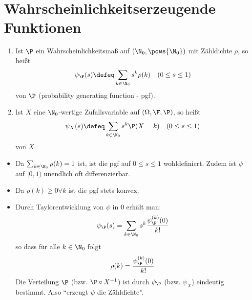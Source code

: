 \section{Wahrscheinlichkeitserzeugende Funktionen}

\begin{definition}
	\label{5_14_definition}
	\begin{enumerate}[leftmargin=*, label=(\arabic*)]
		\item Ist $\P$ ein Wahrscheinlichkeitsmaß auf $(\N_0, \pows{\N_0})$ mit Zähldichte $\rho$, so heißt
		\begin{equation*}
			\psi_{\P}(s) \defeq \sum_{k\in \N_0} s^k \rho(k) \quad (0 \le s \le 1)
		\end{equation*}
		 von $\P$ (probability generating function - pgf).
		\item Ist $X$ eine $\N_0$-wertige Zufallsvariable auf $(\Omega, \F, \P)$, so heißt
		\begin{equation*}
			\psi_X(s) \defeq \sum_{k\in \N_0} s^k \P(X=k) \quad (0 \le s \le 1)
		\end{equation*}
		 von $X$.
	\end{enumerate}
\end{definition}

\begin{*bemerkung}
	\begin{itemize}[leftmargin=*, nolistsep]
		\item Da $\sum_{k\in \N_0} \rho(k) = 1$ ist, ist die pgf auf $0 \le s \le 1$ wohldefiniert. Zudem ist $\psi$ auf $[0,1)$ unendlich oft differenzierbar.
		\item Da $\rho(k) \ge 0 \forall k$ ist die pgf stets konvex.
		\item Durch Taylorentwicklung von $\psi$ in 0 erhält man:
		\begin{equation*}
			\psi_{\P}(s) = \sum_{k\in \N_0} s^k \frac{\psi_{\P}^{(k)}(0)}{k!}
		\end{equation*}
		so dass für alle $k \in \N_0$ folgt
		\begin{equation*}
			\rho(k) = \frac{\psi_{\P}^{(k)}(0)}{k!}
		\end{equation*}
		Die Verteilung $\P$ (bzw. $\P \circ X^{-1}$) ist durch $\psi_{\P}$ (bzw. $\psi_X$) eindeutig bestimmt. Also ``erzeugt $\psi$ die Zähldichte''.
	\end{itemize}
\end{*bemerkung}

